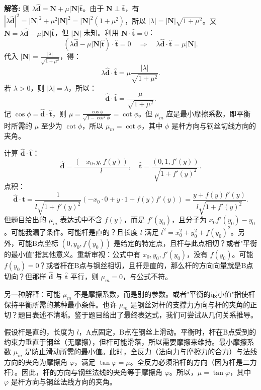 \documentclass[12pt, a4paper, oneside]{ctexart}
\newenvironment{solution}{\par\noindent\textbf{解答:}\quad}{\par}
\begin{document}
\begin{solution}
    则 \(\lambda \hat{\mathbf{d}} = \mathbf{N} + \mu |\mathbf{N}| \hat{\mathbf{t}}\)。由于 \(\mathbf{N} \perp \hat{\mathbf{t}}\)，有 \(|\lambda \hat{\mathbf{d}}|^2 = |\mathbf{N}|^2 + \mu^2 |\mathbf{N}|^2 = |\mathbf{N}|^2 (1+\mu^2)\)，所以 \(|\lambda| = |\mathbf{N}| \sqrt{1+\mu^2}\)。又 \(\mathbf{N} = \lambda \hat{\mathbf{d}} - \mu |\mathbf{N}| \hat{\mathbf{t}}\)，但 \(|\mathbf{N}|\) 未知。利用 \(\mathbf{N} \cdot \hat{\mathbf{t}} = 0\)：
    \[
    (\lambda \hat{\mathbf{d}} - \mu |\mathbf{N}| \hat{\mathbf{t}}) \cdot \hat{\mathbf{t}} = 0 \quad \Rightarrow \quad \lambda \hat{\mathbf{d}} \cdot \hat{\mathbf{t}} = \mu |\mathbf{N}|.
    \]
    代入 \(|\mathbf{N}| = \frac{|\lambda|}{\sqrt{1+\mu^2}}\)，得：
    \[
    \lambda \hat{\mathbf{d}} \cdot \hat{\mathbf{t}} = \mu \frac{|\lambda|}{\sqrt{1+\mu^2}}.
    \]
    若 \(\lambda > 0\)，则 \(|\lambda| = \lambda\)，所以：
    \[
    \hat{\mathbf{d}} \cdot \hat{\mathbf{t}} = \frac{\mu}{\sqrt{1+\mu^2}}.
    \]
    记 \(\cos\phi = \hat{\mathbf{d}} \cdot \hat{\mathbf{t}}\)，则 \(\mu = \frac{\cos\phi}{\sqrt{1-\cos^2\phi}} = \cot\phi\)。但 \(\mu_m\) 应是最小摩擦系数，即平衡时所需的 \(\mu\) 至少为 \(\cot\phi\)，所以 \(\mu_m = \cot\phi\)，其中 \(\phi\) 是杆方向与钢丝切线方向的夹角。
    
    计算 \(\hat{\mathbf{d}} \cdot \hat{\mathbf{t}}\)：
    \[
    \hat{\mathbf{d}} = \frac{(-x_0, y, f(y))}{l}, \quad \hat{\mathbf{t}} = \frac{(0,1,f'(y))}{\sqrt{1+f'(y)^2}}.
    \]
    点积：
    \[
    \hat{\mathbf{d}} \cdot \hat{\mathbf{t}} = \frac{1}{l\sqrt{1+f'(y)^2}} ( -x_0\cdot 0 + y\cdot 1 + f(y) f'(y) ) = \frac{y + f(y) f'(y)}{l\sqrt{1+f'(y)^2}}.
    \]
    但题目给出的 \(\mu_m\) 表达式中不含 \(f(y)\)，而是 \(f'(y_0)\)，且分子为 \(x_0 f'(y_0) - y_0\)。可能我漏了条件。可能杆是直的？且长度 \(l\) 满足 \(l^2 = x_0^2 + y_0^2 + f(y_0)^2\)。另外，可能B点坐标 \((0, y_0, f(y_0))\) 是给定的特定点，且杆与此点相切？或者"平衡的最小值"指其他意义。重新审视：公式中有 \(x_0, y_0, f'(y_0)\)，没有 \(f(y_0)\)。可能 \(f(y_0)=0\)？或者杆在B点与钢丝相切，且杆是直的，那么杆的方向向量就是B点切向？但那样 \(\hat{\mathbf{d}}\) 与 \(\hat{\mathbf{t}}\) 平行，则 \(\mu_m=0\)，与公式不符。
    
    另一种解释：可能 \(\mu_m\) 不是摩擦系数，而是别的参数。或者"平衡的最小值"指使杆保持平衡所需的某种最小条件。也许 \(\mu_m\) 是钢丝对杆的支撑力方向与杆的夹角的正切？题目表述不清晰。鉴于题目给出了最终表达式，我们可尝试从几何关系推导。
    
    假设杆是直的，长度为 \(l\)，A点固定，B点在钢丝上滑动。平衡时，杆在B点受到的约束力垂直于钢丝（无摩擦），但杆可能滑落，所以需要摩擦来维持。最小摩擦系数 \(\mu_m\) 是防止滑动所需的最小值。此时，全反力（法向力与摩擦力的合力）与法线方向的夹角为摩擦角 \(\varphi\)，满足 \(\tan\varphi = \mu\)。全反力必须沿杆的方向（因为杆是二力杆）。因此，杆的方向与钢丝法线的夹角等于摩擦角 \(\varphi\)。所以，\(\mu = \tan\varphi\)，其中 \(\varphi\) 是杆方向与钢丝法线方向的夹角。
    

\end{solution}
\end{document}
